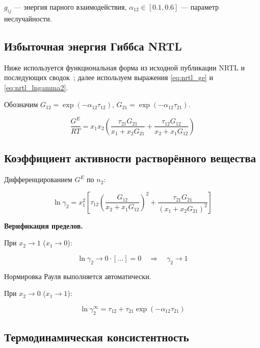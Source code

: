 \documentclass[11pt]{article}
\begin{document}
$g_{ij}$ --- энергия парного взаимодействия, $\alpha_{12} \in [0.1, 0.6]$ --- параметр неслучайности.

\subsection{Избыточная энергия Гиббса NRTL}
\label{subsec:nrtl-ge}

Ниже используется функциональная форма из исходной публикации NRTL и последующих сводок~\cite{renon1968,prausnitz1998}; далее используем выражения \eqref{eq:nrtl_ge} и \eqref{eq:nrtl_lngamma2}.

Обозначим $G_{12} = \exp(-\alpha_{12}\tau_{12})$, $G_{21} = \exp(-\alpha_{12}\tau_{21})$.

\begin{equation}
\frac{G^E}{RT} = x_1 x_2 \left(\frac{\tau_{21} G_{21}}{x_1 + x_2 G_{21}} + \frac{\tau_{12} G_{12}}{x_2 + x_1 G_{12}}\right)
\label{eq:nrtl_ge}
\end{equation}

\subsection{Коэффициент активности растворённого вещества}
\label{subsec:nrtl-gamma2}

Дифференцированием $G^E$ по $n_2$:

\begin{equation}
\ln \gamma_2 = x_1^2 \left[\tau_{12}\!\left(\frac{G_{12}}{x_2 + x_1 G_{12}}\right)^{2} + \frac{\tau_{21} G_{21}}{(x_1 + x_2 G_{21})^2}\right]
\label{eq:nrtl_lngamma2}
\end{equation}

\textbf{Верификация пределов.}

При $x_2 \to 1$ ($x_1 \to 0$):

\begin{equation*}
\ln \gamma_2 \to 0 \cdot [\ldots] = 0 \quad \Rightarrow \quad \gamma_2 \to 1
\end{equation*}

Нормировка Рауля выполняется автоматически.

При $x_2 \to 0$ ($x_1 \to 1$):

\begin{equation*}
\ln \gamma_2^\infty = \tau_{12} + \tau_{21} \exp(-\alpha_{12}\tau_{21})
\end{equation*}

\subsection{Термодинамическая консистентность}
\end{document}
